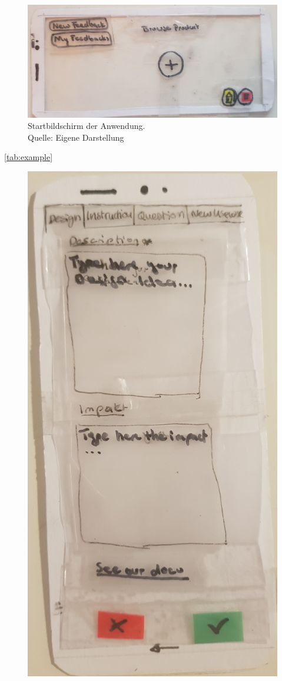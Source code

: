 \begin{figure}[H]
	\centering
	\includegraphics[width=.7\textwidth]{resources/conception/lowfi_edit_delete.jpg}
	\caption{Startbildschirm der Anwendung. \\Quelle: Eigene Darstellung}
	\label{img:sysstem_sketch}
\end{figure}

\autoref{tab:example} 
\begin{figure}[H]
	\label{tab:example}
	\centering
	\begin{minipage}{.5\textwidth}
		\centering
		\includegraphics[width=.8\linewidth]{resources/conception/lowfi_form.jpg}

\end{minipage}
\end{figure}
